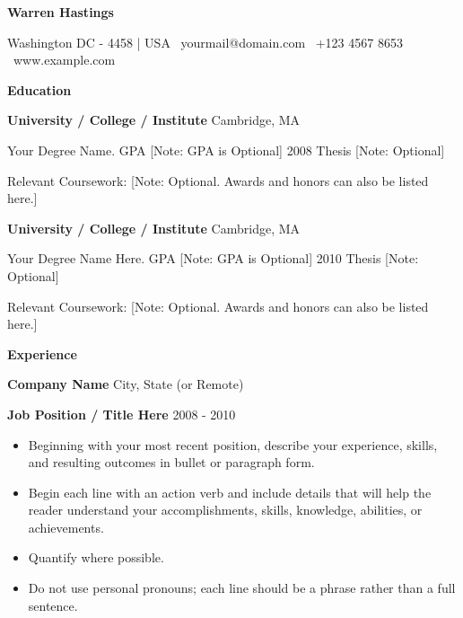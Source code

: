 \documentclass[11pt]{article}
\begin{document}
\begin{center}
    \textbf{Warren Hastings}\\ 
    \hrulefill
\end{center}

\begin{center}
    Washington DC - 4458 | USA \textbullet \ yourmail@domain.com \textbullet \ +123 4567 8653 \textbullet \ www.example.com 
\end{center}

\vspace{0.5pt}

\begin{center}
    \textbf{Education}
\end{center}
\textbf{University / College / Institute} \hfill Cambridge, MA

Your Degree Name. GPA [Note: GPA is Optional] \hfill 2008 Thesis [Note: Optional]

Relevant Coursework: [Note: Optional. Awards and honors can also be listed here.]

\vspace{12pt}

\textbf{University / College / Institute} \hfill Cambridge, MA

Your Degree Name Here. GPA [Note: GPA is Optional] \hfill 2010 Thesis [Note: Optional]

Relevant Coursework: [Note: Optional. Awards and honors can also be listed here.]

\vspace{12pt}

\begin{center}
    \textbf{Experience}
\end{center}
\textbf{Company Name} \hfill City, State (or Remote)

\textbf{Job Position / Title Here} \hfill 2008 - 2010
\begin{itemize}[noitemsep, topsep=0pt, partopsep=0pt, parsep=0pt]
    \item Beginning with your most recent position, describe your experience, skills, and resulting outcomes in bullet or paragraph form.
    \item Begin each line with an action verb and include details that will help the reader understand your accomplishments, skills, knowledge, abilities, or achievements.
    \item Quantify where possible.
    \item Do not use personal pronouns; each line should be a phrase rather than a full sentence.
\end{itemize}
\end{document}
